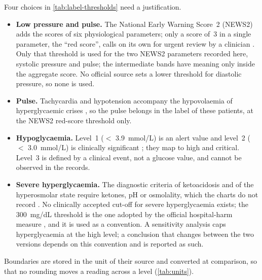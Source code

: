 Four choices in \cref{tab:label-thresholds} need a justification.
\begin{itemize}[nosep]
  \item \textbf{Low pressure and pulse.} The National Early Warning Score~2 (NEWS2) adds the scores of six physiological parameters; only a score of~3 in a single parameter, the ``red score'', calls on its own for urgent review by a clinician \parencite{rcp2017news2}. Only that threshold is used for the two NEWS2 parameters recorded here, systolic pressure and pulse; the intermediate bands have meaning only inside the aggregate score. No official source sets a lower threshold for diastolic pressure, so none is used.
  \item \textbf{Pulse.} Tachycardia and hypotension accompany the hypovolaemia of hyperglycaemic crises \parencite{umpierrez2024}, so the pulse belongs in the label of these patients, at the NEWS2 red-score threshold only.
  \item \textbf{Hypoglycaemia.} Level~1 ($<$ 3.9~mmol/L) is an alert value and level~2 ($<$ 3.0~mmol/L) is clinically significant \parencite{ihsg2017}; they map to high and critical. Level~3 is defined by a clinical event, not a glucose value, and cannot be observed in the records.
  \item \textbf{Severe hyperglycaemia.} The diagnostic criteria of ketoacidosis and of the hyperosmolar state require ketones, pH or osmolality, which the charts do not record \parencite{umpierrez2024}. No clinically accepted cut-off for severe hyperglycaemia exists; the 300~mg/dL threshold is the one adopted by the official hospital-harm measure \parencite{cms871}, and it is used as a convention. A sensitivity analysis caps hyperglycaemia at the high level; a conclusion that changes between the two versions depends on this convention and is reported as such.
\end{itemize}
Boundaries are stored in the unit of their source and converted at comparison, so that no rounding moves a reading across a level (\cref{tab:units}).

